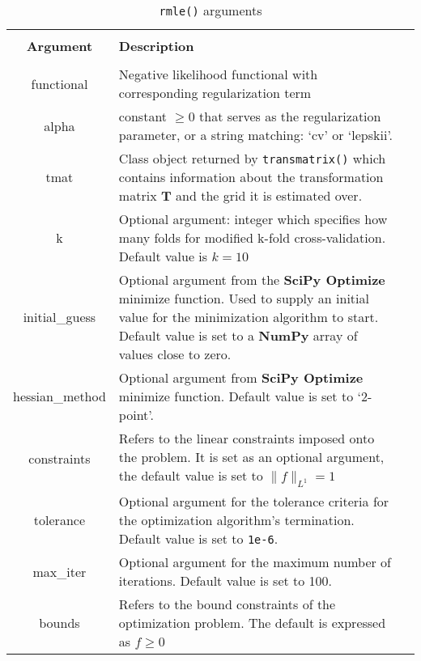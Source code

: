 \documentclass[a4paper,12pt]{article}
\begin{document}
\begin{table}[!h]
	\caption{\texttt{rmle()} arguments}
	\centering 
	\begin{tabular}{c ll} 
		\hline\hline \\ [-1.5ex]
		\textbf{Argument} & \textbf{Description}  \\\hline
		\\ [-1.5ex]
		 \multicolumn{1}{p{3cm}}{\raggedright functional} & \multicolumn{1}{p{11cm}}{\raggedright Negative likelihood functional with corresponding regularization term} \\
		\multicolumn{1}{p{3cm}}{\raggedright alpha}  & \multicolumn{1}{p{11cm}}{\raggedright constant $ \geq 0$ that serves as the regularization parameter, or a string matching: `cv' or `lepskii'.}\\
		\multicolumn{1}{p{3cm}}{\raggedright tmat}   & \multicolumn{1}{p{11cm}}{\raggedright Class object returned by \texttt{transmatrix()} which contains information about the transformation matrix $\mathbf{T}$ and the grid it is estimated over.}  \\
		\multicolumn{1}{p{3cm}}{\raggedright k}  & \multicolumn{1}{p{11cm}}{\raggedright Optional argument: integer which specifies how many folds for modified k-fold cross-validation. Default value is $k = 10$ }\\
		\multicolumn{1}{p{3cm}}{\raggedright initial\_guess}  & \multicolumn{1}{p{11cm}}{\raggedright Optional argument from the \textbf{SciPy Optimize} minimize function. Used to supply an initial value for the minimization algorithm to start. Default value is set to a \textbf{NumPy} array of values close to zero.} \\
		\multicolumn{1}{p{3cm}}{\raggedright hessian\_method} & \multicolumn{1}{p{11cm}}{\raggedright Optional argument from \textbf{SciPy Optimize} minimize function. Default value is set to `2-point'.} \\
		\multicolumn{1}{p{3cm}}{\raggedright constraints} & \multicolumn{1}{p{11cm}}{\raggedright Refers to the linear constraints imposed onto the problem. It is set as an optional argument, the default value is set to $\|f\|_{L^1}=1$} \\
		\multicolumn{1}{p{3cm}}{\raggedright tolerance}  &  \multicolumn{1}{p{11cm}}{\raggedright Optional argument for the tolerance criteria for the optimization algorithm's termination. Default value is set to \texttt{1e-6}.} \\
		\multicolumn{1}{p{3cm}}{\raggedright max\_iter}  & \multicolumn{1}{p{11cm}}{\raggedright Optional argument for the maximum number of iterations. Default value is set to 100.} \\
		\multicolumn{1}{p{3cm}}{\raggedright bounds}  & \multicolumn{1}{p{11cm}}{\raggedright Refers to the bound constraints of the optimization problem. The default is expressed as $f\ge 0$ } \\
		\hline
	\end{tabular}
	\label{tab:sobolev_args}
\end{table}
\end{document}

